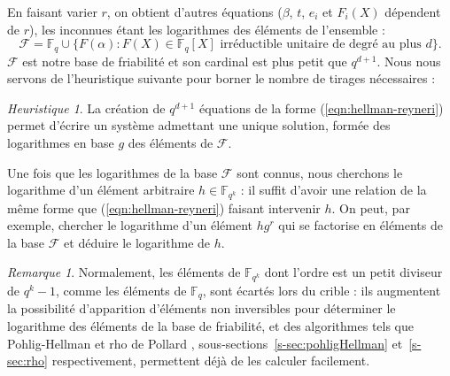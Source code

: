 \documentclass[a4paper, titlepage, 11pt]{article}
\theoremstyle{definition}
\theoremstyle{remark}
\newtheorem{rema}[theo]{Remarque}
\newtheorem{heur}[theo]{Heuristique}
\def\gf #1{\mathbb{F}_{#1}}
\begin{document}
En faisant varier $r$, on obtient d'autres équations ($\beta$, $t$, $e_i$ et $F_i(X)$ dépendent de $r$), les inconnues étant les logarithmes des éléments de l'ensemble :
$$\mathcal{F} =  \gf{q} \cup \{F(\alpha) : F(X) \in \gf{q}[X] \text{ irréductible unitaire de degré au plus } d \}.$$
$\mathcal{F}$ est notre base de friabilité et son cardinal est plus petit que $q^{d+1}$. Nous nous servons de l'heuristique suivante pour borner le nombre de tirages nécessaires :
\begin{heur}
La création de $q^{d+1}$ équations de la forme (\ref{eqn:hellman-reyneri}) permet d'écrire un système admettant une unique solution, formée des logarithmes en base $g$ des éléments de $\mathcal{F}$.
\end{heur}

Une fois que les logarithmes de la base $\mathcal{F}$ sont connus, nous cherchons le logarithme d'un élément arbitraire $h \in \gf{q^k}$ : il suffit d'avoir une relation de la même forme que (\ref{eqn:hellman-reyneri}) faisant intervenir $h$. On peut, par exemple, chercher le logarithme d'un élément $hg^r$ qui se factorise en éléments de la base $\mathcal{F}$ et déduire le logarithme de $h$.

\begin{rema}
Normalement, les éléments de $\gf{q^k}$ dont l'ordre est un petit diviseur de $q^k-1$, comme les éléments de $\gf{q}$, sont écartés lors du crible : ils augmentent la possibilité d'apparition d'éléments non inversibles pour déterminer le logarithme des éléments de la base de friabilité, et des algorithmes tels que Pohlig-Hellman \cite{pohligHellman1978} et rho de Pollard \cite{pollard1978}, sous-sections~\ref{s-sec:pohligHellman} et~\ref{s-sec:rho} respectivement, permettent déjà de les calculer facilement.
\end{rema}
\end{document}

